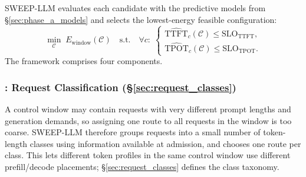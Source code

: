 SWEEP-LLM evaluates each candidate with the predictive models from \S\ref{sec:phase_a_models} and selects the lowest-energy feasible configuration:
\begin{equation}
\min_{\mathcal{C}} \; E_{\mathrm{window}}(\mathcal{C})
\quad \text{s.t.} \quad
\forall c:\;
\begin{cases}
\widehat{\mathrm{TTFT}}_c(\mathcal{C}) \le \mathrm{SLO}_{\mathrm{TTFT}}, \\
\widehat{\mathrm{TPOT}}_c(\mathcal{C}) \le \mathrm{SLO}_{\mathrm{TPOT}}.
\end{cases}
\label{eq:objective}
\end{equation}
The framework comprises four components.

\subsubsection*{\textnormal{\textbf{: Request Classification (\S\ref{sec:request_classes})}}}

A control window may contain requests with very different prompt lengths and generation demands, so assigning one route to all requests in the window is too coarse.
SWEEP-LLM therefore groups requests into a small number of token-length classes using information available at admission, and chooses one route per class.
This lets different token profiles in the same control window use different prefill/decode placements; \S\ref{sec:request_classes} defines the class taxonomy.

